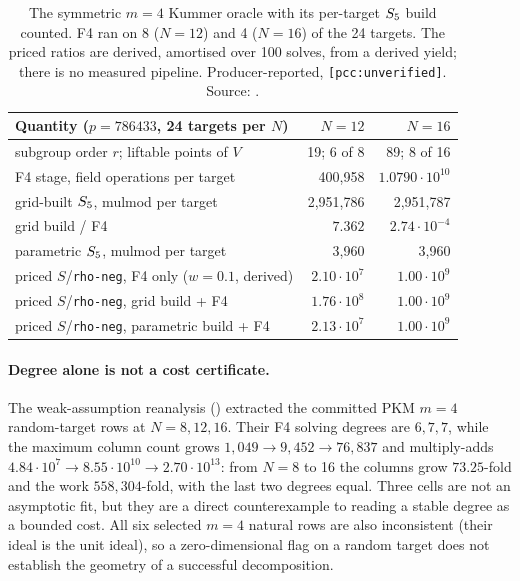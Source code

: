 \begin{table}[t]
\centering\small
\begin{tabular}{@{}lrr@{}}
\toprule
Quantity ($p=786433$, 24 targets per $N$) & $N=12$ & $N=16$ \\
\midrule
subgroup order $r$; liftable points of $V$ & 19; 6 of 8 & 89; 8 of 16 \\
F4 stage, field operations per target & 400{,}958 & $1.0790\cdot10^{10}$ \\
grid-built $S_{5}$, mulmod per target & 2{,}951{,}786 & 2{,}951{,}787 \\
grid build / F4 & $7.362$ & $2.74\cdot10^{-4}$ \\
parametric $S_{5}$, mulmod per target & 3{,}960 & 3{,}960 \\
priced $S$/\texttt{rho-neg}, F4 only ($w=0.1$, derived) & $2.10\cdot10^7$ & $1.00\cdot10^9$ \\
priced $S$/\texttt{rho-neg}, grid build + F4 & $1.76\cdot10^8$ & $1.00\cdot10^9$ \\
priced $S$/\texttt{rho-neg}, parametric build + F4 & $2.13\cdot10^7$ & $1.00\cdot10^9$ \\
\bottomrule
\end{tabular}
\caption[]{The symmetric $m=4$ Kummer oracle with its per-target $S_{5}$
build counted. F4 ran on 8 ($N=12$) and 4 ($N=16$) of the 24 targets. The
priced ratios are derived, amortised over 100 solves, from a derived yield;
there is no measured pipeline. Producer-reported, \texttt{[pcc:unverified]}.
Source: .}
\label{tab:pa-pkm-priced}
\end{table}

\paragraph{Degree alone is not a cost certificate.} The weak-assumption
reanalysis () extracted the
committed PKM $m=4$ random-target rows at $N=8,12,16$. Their F4 solving
degrees are $6,7,7$, while the maximum column count grows $1{,}049\to9{,}452
\to76{,}837$ and multiply-adds $4.84\cdot10^7\to8.55\cdot10^{10}\to
2.70\cdot10^{13}$: from $N=8$ to 16 the columns grow $73.25$-fold and the
work $558{,}304$-fold, with the last two degrees equal. Three cells are not
an asymptotic fit, but they are a direct counterexample to reading a stable
degree as a bounded cost. All six selected $m=4$ natural rows are also
inconsistent (their ideal is the unit ideal), so a zero-dimensional flag on
a random target does not establish the geometry of a successful
decomposition.

